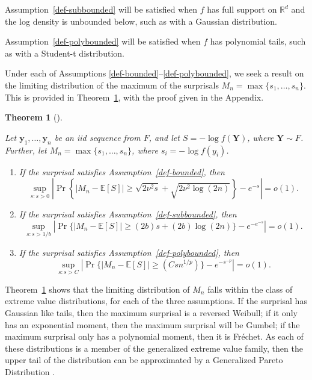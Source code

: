 \documentclass[
  12pt]{article}
\providecommand{\tightlist}{%
  \setlength{\itemsep}{0pt}\setlength{\parskip}{0pt}}
\newcommand{\E}{\mathbb{E}}
\theoremstyle{definition}
\theoremstyle{plain}
\theoremstyle{plain}
\newtheorem{theorem}{Theorem}[section]
\theoremstyle{plain}
\theoremstyle{remark}
\begin{document}
Assumption~\ref{def-subbounded} will be satisfied when \(f\) has full
support on \(\mathbb{R}^d\) and the log density is unbounded below, such
as with a Gaussian distribution.

Assumption~\ref{def-polybounded} will be satisfied when \(f\) has
polynomial tails, such as with a Student-t distribution.

Under each of Assumptions \ref{def-bounded}--\ref{def-polybounded}, we
seek a result on the limiting distribution of the maximum of the
surprisals \(M_n = \max\{s_1,\dots,s_n\}\). This is provided in
Theorem~\ref{thm-three_types}, with the proof given in the Appendix.

\begin{theorem}[]\protect\hypertarget{thm-three_types}{}\label{thm-three_types}

Let \(\bm{y}_1,\dots,\bm{y}_n\) be an iid sequence from \(F\), and let
\(S =-\log f(\bm{Y})\), where \(\bm{Y}\sim F\). Further, let
\(M_n=\max\{s_1,\dots,s_n\}\), where \(s_i=-\log f(y_i)\).

\begin{enumerate}
\def\labelenumi{\arabic{enumi}.}
\tightlist
\item
  If the surprisal satisfies Assumption~\ref{def-bounded}, then \[
    \sup_{s:s>0}\left|\Pr\left\{\big|M_n-\E[S]\big|\ge \sqrt{2\nu^2 s}+\sqrt{2\nu^2\log(2n)}\right\}-e^{-s}\right|=o(1).
  \]
\item
  If the surprisal satisfies Assumption~\ref{def-subbounded}, then \[
    \sup_{s:s>1/b}\left|\Pr\Big\{\big|M_n-\E[S]\big|\ge (2b)s+(2b)\log(2n)\Big\}-e^{-e^{-s}}\right|=o(1).
  \]
\item
  If the surprisal satisfies Assumption~\ref{def-polybounded}, then \[
   \sup_{s:s>C}\left|\Pr\Big\{\big|M_n-\E[S]\big|\ge (Csn^{1/p})\Big\}-e^{-s^{-p}}\right|=o(1).
  \]
\end{enumerate}

\end{theorem}

Theorem~\ref{thm-three_types} shows that the limiting distribution of
\(M_n\) falls within the class of extreme value distributions, for each
of the three assumptions. If the surprisal has Gaussian like tails, then
the maximum surprisal is a reversed Weibull; if it only has an
exponential moment, then the maximum surprisal will be Gumbel; if the
maximum surprisal only has a polynomial moment, then it is Fréchet. As
each of these distributions is a member of the generalized extreme value
family, then the upper tail of the distribution can be approximated by a
Generalized Pareto Distribution \citep[Theorem
4.1]{coles2001introduction}.
\end{document}
